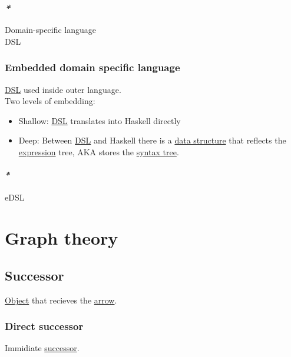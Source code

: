 \documentclass[a4paper,14pt,oneside]{book}
\begin{document}
\subsection{\emph{*}}
\label{sec:org31aff30}

\label{org884e64d}Domain-specific language\\
\label{org388ef81}DSL\\

\subsection{\label{org26db302}Embedded domain specific language}
\label{sec:org55f38fc}

\hyperref[org388ef81]{DSL} used inside outer language.\\

Two levels of embedding:\\

\begin{itemize}
\item Shallow: \hyperref[org388ef81]{DSL} translates into Haskell directly\\
\item Deep: Between \hyperref[org388ef81]{DSL} and Haskell there is a \hyperref[orgc195a61]{data structure} that reflects the \hyperref[org70841e3]{expression} tree, AKA stores the \hyperref[orgdb9d032]{syntax tree}.\\
\end{itemize}

\subsubsection{\emph{*}}
\label{sec:org1c441e5}

\label{orgc8a2683}eDSL\\

\chapter{\label{org23c3590}Graph theory}
\label{sec:org78e5064}
\section{\label{orgad65ffe}Successor}
\label{sec:org7b29220}
\hyperref[org75b9876]{Object} that recieves the \hyperref[orga2011ae]{arrow}.\\

\subsection{\label{org9b59231}Direct successor}
\label{sec:org407fa0b}
Immidiate \hyperref[orgad65ffe]{successor}.\\
\end{document}
